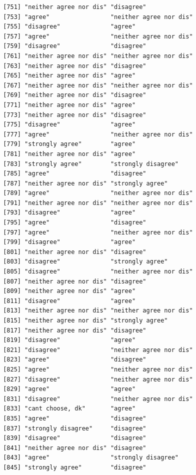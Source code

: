 \documentclass{beamer}\usepackage[]{graphicx}\usepackage[]{color}
\makeatletter
\newenvironment{kframe}{%
 \def\at@end@of@kframe{}%
 \ifinner\ifhmode%
  \def\at@end@of@kframe{\end{minipage}}%
  \begin{minipage}{\columnwidth}%
 \fi\fi%
 \def\FrameCommand##1{\hskip\@totalleftmargin \hskip-\fboxsep
 \colorbox{shadecolor}{##1}\hskip-\fboxsep
     \hskip-\linewidth \hskip-\@totalleftmargin \hskip\columnwidth}%
 \MakeFramed {\advance\hsize-\width
   \@totalleftmargin\z@ \linewidth\hsize
   \@setminipage}}%
 {\par\unskip\endMakeFramed%
 \at@end@of@kframe}
\newenvironment{knitrout}{}{} %
\makeatother
\begin{document}
\begin{frame}[fragile]
\begin{knitrout}
\begin{kframe}
\begin{verbatim}
 [751] "neither agree nor dis" "disagree"             
 [753] "agree"                 "neither agree nor dis"
 [755] "disagree"              "agree"                
 [757] "agree"                 "neither agree nor dis"
 [759] "disagree"              "disagree"             
 [761] "neither agree nor dis" "neither agree nor dis"
 [763] "neither agree nor dis" "disagree"             
 [765] "neither agree nor dis" "agree"                
 [767] "neither agree nor dis" "neither agree nor dis"
 [769] "neither agree nor dis" "disagree"             
 [771] "neither agree nor dis" "agree"                
 [773] "neither agree nor dis" "disagree"             
 [775] "disagree"              "agree"                
 [777] "agree"                 "neither agree nor dis"
 [779] "strongly agree"        "agree"                
 [781] "neither agree nor dis" "agree"                
 [783] "strongly agree"        "strongly disagree"    
 [785] "agree"                 "disagree"             
 [787] "neither agree nor dis" "strongly agree"       
 [789] "agree"                 "neither agree nor dis"
 [791] "neither agree nor dis" "neither agree nor dis"
 [793] "disagree"              "agree"                
 [795] "agree"                 "disagree"             
 [797] "agree"                 "neither agree nor dis"
 [799] "disagree"              "agree"                
 [801] "neither agree nor dis" "disagree"             
 [803] "disagree"              "strongly agree"       
 [805] "disagree"              "neither agree nor dis"
 [807] "neither agree nor dis" "disagree"             
 [809] "neither agree nor dis" "agree"                
 [811] "disagree"              "agree"                
 [813] "neither agree nor dis" "neither agree nor dis"
 [815] "neither agree nor dis" "strongly agree"       
 [817] "neither agree nor dis" "disagree"             
 [819] "disagree"              "agree"                
 [821] "disagree"              "neither agree nor dis"
 [823] "agree"                 "disagree"             
 [825] "agree"                 "neither agree nor dis"
 [827] "disagree"              "neither agree nor dis"
 [829] "agree"                 "agree"                
 [831] "disagree"              "neither agree nor dis"
 [833] "cant choose, dk"       "agree"                
 [835] "agree"                 "disagree"             
 [837] "strongly disagree"     "disagree"             
 [839] "disagree"              "disagree"             
 [841] "neither agree nor dis" "disagree"             
 [843] "agree"                 "strongly disagree"    
 [845] "strongly agree"        "disagree"             

\end{verbatim}
\end{kframe}
\end{knitrout}
\end{frame}
\end{document}

